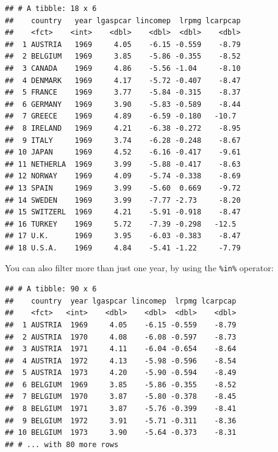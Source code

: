 \documentclass[]{gitbook}
\newenvironment{Shaded}{\begin{snugshade}}{\end{snugshade}}
\newcommand{\DecValTok}[1]{\textcolor[rgb]{0.00,0.00,0.81}{#1}}
\newcommand{\KeywordTok}[1]{\textcolor[rgb]{0.13,0.29,0.53}{\textbf{#1}}}
\newcommand{\NormalTok}[1]{#1}
\newcommand{\OperatorTok}[1]{\textcolor[rgb]{0.81,0.36,0.00}{\textbf{#1}}}
\newcommand{\StringTok}[1]{\textcolor[rgb]{0.31,0.60,0.02}{#1}}
\theoremstyle{definition}
\theoremstyle{definition}
\theoremstyle{definition}
\theoremstyle{remark}
\begin{document}
\begin{verbatim}
## # A tibble: 18 x 6
##    country   year lgaspcar lincomep  lrpmg lcarpcap
##    <fct>    <int>    <dbl>    <dbl>  <dbl>    <dbl>
##  1 AUSTRIA   1969     4.05    -6.15 -0.559    -8.79
##  2 BELGIUM   1969     3.85    -5.86 -0.355    -8.52
##  3 CANADA    1969     4.86    -5.56 -1.04     -8.10
##  4 DENMARK   1969     4.17    -5.72 -0.407    -8.47
##  5 FRANCE    1969     3.77    -5.84 -0.315    -8.37
##  6 GERMANY   1969     3.90    -5.83 -0.589    -8.44
##  7 GREECE    1969     4.89    -6.59 -0.180   -10.7 
##  8 IRELAND   1969     4.21    -6.38 -0.272    -8.95
##  9 ITALY     1969     3.74    -6.28 -0.248    -8.67
## 10 JAPAN     1969     4.52    -6.16 -0.417    -9.61
## 11 NETHERLA  1969     3.99    -5.88 -0.417    -8.63
## 12 NORWAY    1969     4.09    -5.74 -0.338    -8.69
## 13 SPAIN     1969     3.99    -5.60  0.669    -9.72
## 14 SWEDEN    1969     3.99    -7.77 -2.73     -8.20
## 15 SWITZERL  1969     4.21    -5.91 -0.918    -8.47
## 16 TURKEY    1969     5.72    -7.39 -0.298   -12.5 
## 17 U.K.      1969     3.95    -6.03 -0.383    -8.47
## 18 U.S.A.    1969     4.84    -5.41 -1.22     -7.79
\end{verbatim}

You can also filter more than just one year, by using the
\texttt{\%in\%} operator:

\begin{Shaded}
\end{Shaded}

\begin{verbatim}
## # A tibble: 90 x 6
##    country  year lgaspcar lincomep  lrpmg lcarpcap
##    <fct>   <int>    <dbl>    <dbl>  <dbl>    <dbl>
##  1 AUSTRIA  1969     4.05    -6.15 -0.559    -8.79
##  2 AUSTRIA  1970     4.08    -6.08 -0.597    -8.73
##  3 AUSTRIA  1971     4.11    -6.04 -0.654    -8.64
##  4 AUSTRIA  1972     4.13    -5.98 -0.596    -8.54
##  5 AUSTRIA  1973     4.20    -5.90 -0.594    -8.49
##  6 BELGIUM  1969     3.85    -5.86 -0.355    -8.52
##  7 BELGIUM  1970     3.87    -5.80 -0.378    -8.45
##  8 BELGIUM  1971     3.87    -5.76 -0.399    -8.41
##  9 BELGIUM  1972     3.91    -5.71 -0.311    -8.36
## 10 BELGIUM  1973     3.90    -5.64 -0.373    -8.31
## # ... with 80 more rows
\end{verbatim}
\end{document}
